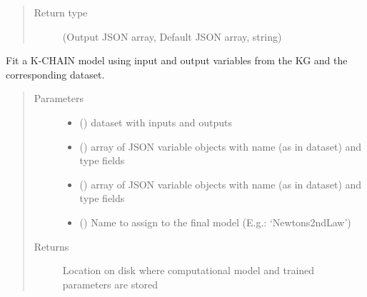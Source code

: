 \documentclass[letterpaper,10pt,english]{sphinxmanual}
\begin{document}
\begin{fulllineitems}
\begin{fulllineitems}
\begin{quote}
\begin{description}
\begin{itemize}
\end{itemize}


\item[{Return type}] \leavevmode
(Output JSON array, Default JSON array, string)

\end{description}\end{quote}

\end{fulllineitems}


\begin{fulllineitems}
\label{\detokenize{index:kChain.kChainModel.fitModel}}
Fit a K-CHAIN model using input and output variables from the KG and
the corresponding dataset.
\begin{quote}\begin{description}
\item[{Parameters}] \leavevmode\begin{itemize}
\item {} 
 () \textendash{} dataset with inputs and outputs

\item {} 
 () \textendash{} array of JSON variable objects with name (as in dataset) and type fields

\item {} 
 () \textendash{} array of JSON variable objects with name (as in dataset) and type fields

\item {} 
 () \textendash{} Name to assign to the final model (E.g.: ‘Newtons2ndLaw’)

\end{itemize}

\item[{Returns}] \leavevmode
Location on disk where computational model and trained parameters are stored


\end{description}
\end{quote}
\end{fulllineitems}
\end{fulllineitems}
\end{document}
